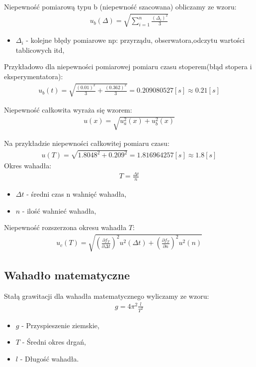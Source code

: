 \documentclass[11pt]{article}
\begin{document}
    \noindent Niepewność pomiarową typu b (niepewność szacowana) obliczamy ze wzoru:
    \begin{gather*}
        u_b(\Delta)=\sqrt{\sum_{i=1}^{n}\frac{(\Delta_i)^2}{3}}
    \end{gather*}
    {\footnotesize
        \begin{itemize}
            \item[] $\Delta_i$ - kolejne błędy pomiarowe np: przyrządu, obserwatora,odczytu wartości tablicowych itd,
        \end{itemize}}
    \noindent Przykładowo dla niepewności pomiarowej pomiaru czasu stoperem(błąd stopera i eksperymentatora):
    \begin{gather*}
        u_b(t)=\sqrt{\frac{(0.01)^2}{3}+\frac{(0.362)^2}{3}}=0.209080527[s]\approx 0.21[s]
    \end{gather*}

    \noindent Niepewność całkowita wyraża się wzorem:
    \begin{gather*}
        u(x)=\sqrt{u_a^2(x)+u_b^2(x)}
    \end{gather*}

    \noindent Na przykładzie niepewności całkowitej pomiaru czasu:
    \begin{gather*}
        u(T)=\sqrt{1.8048^2+0.209^2}=1.816964257[s]\approx 1.8[s]
    \end{gather*}
    \noindent Okres wahadła:
    \begin{gather*}
        T=\frac{\Delta t}{n}
    \end{gather*}
    {\footnotesize
        \begin{itemize}
            \item[] $\Delta t$ - średni czas n wahnięć wahadła,
            \item[] $n$ - ilość wahnieć wahadła,
        \end{itemize}}

    \noindent Niepewność rozszerzona okresu wahadła $T$:
    \begin{gather*}
        u_c(T)=\sqrt{\left(\frac{\partial f_T}{\partial \Delta t}\right)^2u^2(\Delta t)+\left(\frac{\partial f_T}{\partial n}\right)^2 u^2(n)}
    \end{gather*}

    \subsection{Wahadło matematyczne}
    \noindent Stałą grawitacji dla wahadła matematycznego wyliczamy ze wzoru:
    \begin{gather*}
        g = 4\pi^2 \frac{l}{T^2}
    \end{gather*}
    {\footnotesize\begin{itemize}
         \setlength\itemsep{0.1em}
         \item[] $g$ - Przyspieszenie ziemskie,
         \item[] $T$ - Średni okres drgań,
         \item[] $l$ - Długość wahadła.
    \end{itemize}}
\end{document}
